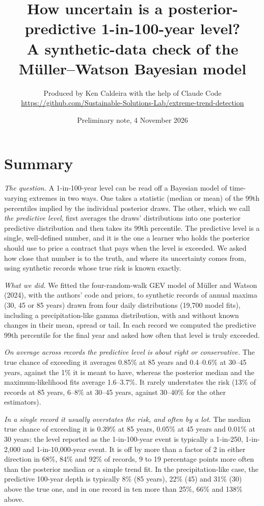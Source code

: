 \documentclass[11pt]{article}
\title{\vspace{-3.2em}How uncertain is a posterior-predictive 1-in-100-year level?\\
\large A synthetic-data check of the M\"uller--Watson Bayesian model}
\author{Produced by Ken Caldeira with the help of Claude Code \\ \small\url{https://github.com/Sustainable-Solutions-Lab/extreme-trend-detection}}
\date{Preliminary note, 4 November 2026}
\begin{document}
\maketitle
\vspace{-2.0em}

\section*{Summary}

\emph{The question.} A 1-in-100-year level can be read off a Bayesian model of time-varying
extremes in two ways. One takes a statistic (median or mean) of the 99th percentiles implied by
the individual posterior draws. The other, which we call \emph{the predictive level}, first
averages the draws' distributions into one posterior predictive distribution and then takes its
99th percentile. The predictive level is a single, well-defined number, and it is the one a
learner who holds the posterior should use to price a contract that pays when the level is
exceeded. We asked how close that number is to the truth, and where its uncertainty comes from,
using synthetic records whose true risk is known exactly.

\emph{What we did.} We fitted the four-random-walk GEV model of M\"uller and Watson (2024), with
the authors' code and priors, to synthetic records of annual maxima (30, 45 or 85 years)
drawn from four daily distributions (19,700 model fits), including a precipitation-like gamma distribution, with
and without known changes in their mean, spread or tail. In each record we computed the predictive
99th percentile for the final year and asked how often that level is truly exceeded.

\emph{On average across records the predictive level is about right or conservative.} The true
chance of exceeding it averages 0.85\% at 85 years and 0.4--0.6\% at 30--45 years, against the
1\% it is meant to have, whereas the posterior median and the maximum-likelihood fits average
1.6--3.7\%. It rarely understates the risk (13\% of records at 85 years, 6--8\% at 30--45 years, against
30--40\% for the other estimators).

\emph{In a single record it usually overstates the risk, and often by a lot.} The median true
chance of exceeding it is 0.39\% at 85 years, 0.05\% at 45 years and 0.01\% at 30 years: the
level reported as the 1-in-100-year event is typically a 1-in-250, 1-in-2,000 and 1-in-10,000-year
event. It is off by more than a factor of 2 in either direction in 68\%, 84\% and 92\% of records,
9 to 19 percentage points more often than the posterior median or a simple trend fit. In the
precipitation-like case, the predictive 100-year depth is typically 8\% (85 years), 22\% (45) and
31\% (30) above the true one, and in one record in ten more than 25\%, 66\% and 138\% above.
\end{document}
